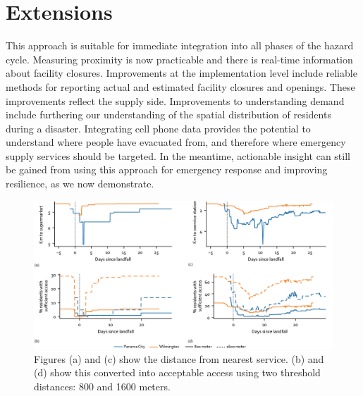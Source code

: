 \documentclass[9pt,twoside,lineno]{pnas-new}
\begin{document}
\section*{Extensions}

This approach is suitable for immediate integration into all phases of the hazard cycle. 
Measuring proximity is now practicable and there is real-time information about facility closures. 
Improvements at the implementation level include reliable methods for reporting actual and estimated facility closures and openings. 
These improvements reflect the supply side. 
Improvements to understanding demand include furthering our understanding of the spatial distribution of residents during a disaster.
Integrating cell phone data provides the potential to understand where people have evacuated from, and therefore where emergency supply services should be targeted. 
In the meantime, actionable insight can still be gained from using this approach for emergency response and improving resilience, as we now demonstrate.







\begin{figure}
    \centering
    \includegraphics[width=\linewidth]{report/fig/sufficient_access.png}
    \caption{
    Figures (a) and (c) show the distance from nearest service. (b) and (d) show this converted into acceptable access using two threshold distances: 800 and 1600 meters.
    }
    \label{figS:suff_access}
\end{figure}
\end{document}
